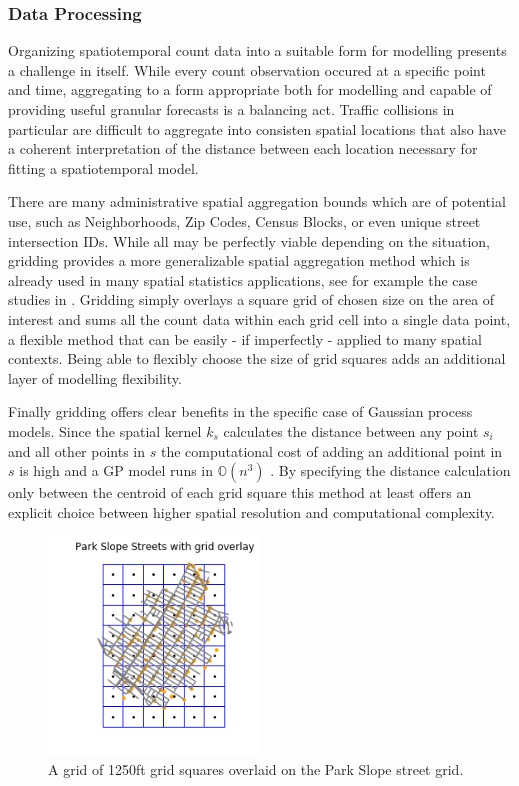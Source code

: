 \documentclass{article}
\begin{document}
\subsubsection{Data Processing}

Organizing spatiotemporal count data into a suitable form for modelling presents a challenge in itself. While every count observation occured at a specific point and time, aggregating to a form appropriate both for modelling and capable of providing useful granular forecasts is a balancing act. Traffic collisions in particular are difficult to aggregate into consisten spatial locations that also have a coherent interpretation of the distance between each location necessary for fitting a spatiotemporal model. \par

There are many administrative spatial aggregation bounds which are of potential use, such as Neighborhoods, Zip Codes, Census Blocks, or even unique street intersection IDs. While all may be perfectly viable depending on the situation, gridding provides a more generalizable spatial aggregation method which is already used in many spatial statistics applications, see for example the case studies in \cite{blangiardo_2015}. Gridding simply overlays a square grid of chosen size on the area of interest and sums all the count data within each grid cell into a single data point, a flexible method that can be easily - if imperfectly - applied to many spatial contexts. Being able to flexibly choose the size of grid squares adds an additional layer of modelling flexibility. \par

Finally gridding offers clear benefits in the specific case of Gaussian process models. Since the spatial kernel $k_s$ calculates the distance between any point $s_i$ and all other points in $s$ the computational cost of adding an additional point in $s$ is high and a GP model runs in $\mathbb{O}(n^3)$  \cite{flaxman_2015_FastKron}. By specifying the distance calculation only between the centroid of each grid square this method at least offers an explicit choice between higher spatial resolution and computational complexity.

\begin{figure}[h!]
  \caption{A grid of 1250ft grid squares overlaid on the Park Slope street grid.}
  \includegraphics[width=0.5\textwidth]{PS_street_grid}
\end{figure}






\end{document}
